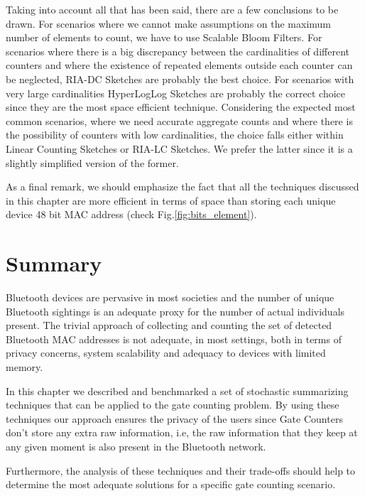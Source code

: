 Taking into account all that has been said, there are a few
conclusions to be drawn. For scenarios where we cannot make
assumptions on the maximum number of elements to count, we have to use
Scalable Bloom Filters. For scenarios where there is a big discrepancy
between the cardinalities of different counters and where the
existence of repeated elements outside each counter can be neglected,
RIA-DC Sketches are probably the best choice. For scenarios with very
large cardinalities HyperLogLog Sketches are probably the correct
choice since they are the most space efficient technique.  Considering
the expected most common scenarios, where we need accurate aggregate
counts and where there is the possibility of counters with low
cardinalities, the choice falls either within Linear Counting Sketches
or RIA-LC Sketches. We prefer the latter since it is a slightly
simplified version of the former.

As a final remark, we should emphasize the fact that all the
techniques discussed in this chapter are more efficient in terms of
space than storing each unique device 48 bit MAC address (check
Fig.\ref{fig:bits_element}).

\section{Summary}
\label{sec:gc_summary}
Bluetooth devices are pervasive in most societies and the number of unique
Bluetooth sightings is an adequate proxy for the number of actual individuals
present. The trivial approach of collecting and counting the set of detected
Bluetooth MAC addresses is not adequate, in most settings, both in terms of
privacy concerns, system scalability and adequacy to devices with limited
memory.

In this chapter we described and benchmarked a set of stochastic summarizing
techniques that can be applied to the gate counting problem. By using these
techniques our approach ensures the privacy of the users since Gate Counters
don't store any extra raw information, i.e, the raw information that
they keep at any given moment is also present in the Bluetooth network.

Furthermore, the analysis of these techniques and their trade-offs
should help to determine the most adequate solutions for a specific
gate counting scenario. %

